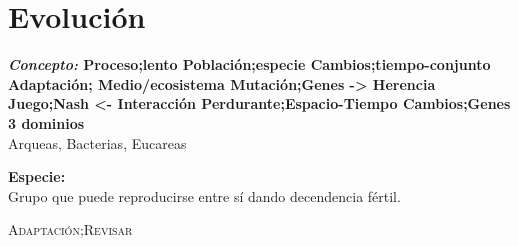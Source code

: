\chapter{Evolución}

\textbf{\textit{Concepto: }Proceso;lento Población;especie Cambios;tiempo-conjunto Adaptación; Medio/ecosistema Mutación;Genes -> Herencia Juego;Nash <- Interacción Perdurante;Espacio-Tiempo Cambios;Genes}\\

\textbf{3 dominios}\\
Arqueas, Bacterias, Eucareas

\textbf{Especie:}\\
Grupo que puede reproducirse entre sí dando decendencia fértil.

\textsc{Adaptación;Revisar}



